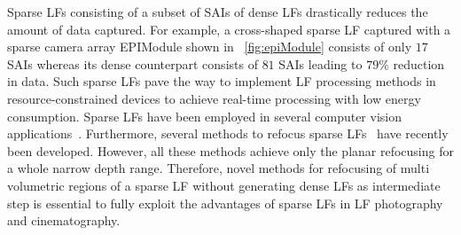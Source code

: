 Sparse LFs consisting of a subset of SAIs of dense LFs drastically reduces the amount of data captured. For example, a cross-shaped sparse LF captured with a sparse camera array EPIModule shown in \figurename~\ref{fig:epiModule} consists of only $17$ SAIs whereas its dense counterpart consists of $81$ SAIs leading to $79\%$ reduction in data. Such sparse LFs pave the way to implement LF processing methods in resource-constrained devices to achieve real-time processing with low energy consumption. Sparse LFs have been employed in several computer vision applications~\cite{jiang2018sparse_depth,learning_view_synthesis}. Furthermore, several methods to refocus sparse LFs~\cite{2015fast_real,alain2021spatio_sparse} have recently been developed. However, all these methods achieve only the planar refocusing for a whole narrow depth range. Therefore,
novel methods for refocusing of multi volumetric regions of a sparse LF without generating dense LFs as intermediate step is essential to fully exploit the advantages of sparse LFs in LF photography and cinematography.    



